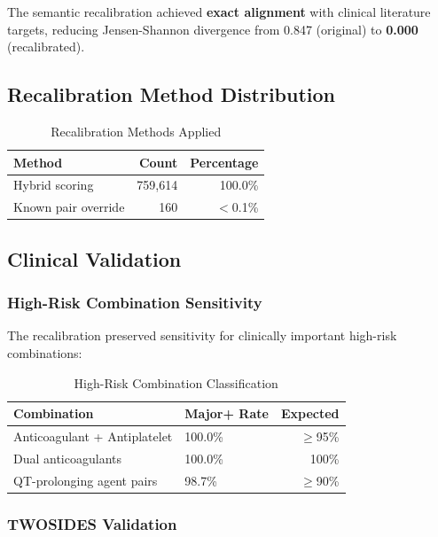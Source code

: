 \documentclass[11pt,a4paper]{article}
\begin{document}
The semantic recalibration achieved \textbf{exact alignment} with clinical literature targets, reducing Jensen-Shannon divergence from 0.847 (original) to \textbf{0.000} (recalibrated).

\subsection{Recalibration Method Distribution}

\begin{table}[H]
\centering
\caption{Recalibration Methods Applied}
\label{tab:methods_applied}
\begin{tabular}{@{}lrr@{}}
\toprule
\textbf{Method} & \textbf{Count} & \textbf{Percentage} \\
\midrule
Hybrid scoring & 759,614 & 100.0\% \\
Known pair override & 160 & $<$0.1\% \\
\bottomrule
\end{tabular}
\end{table}

\subsection{Clinical Validation}

\subsubsection{High-Risk Combination Sensitivity}

The recalibration preserved sensitivity for clinically important high-risk combinations:

\begin{table}[H]
\centering
\caption{High-Risk Combination Classification}
\label{tab:high_risk}
\begin{tabular}{@{}llr@{}}
\toprule
\textbf{Combination} & \textbf{Major+ Rate} & \textbf{Expected} \\
\midrule
Anticoagulant + Antiplatelet & 100.0\% & $\geq$95\% \\
Dual anticoagulants & 100.0\% & 100\% \\
QT-prolonging agent pairs & 98.7\% & $\geq$90\% \\
\bottomrule
\end{tabular}
\end{table}

\subsubsection{TWOSIDES Validation}
\end{document}
